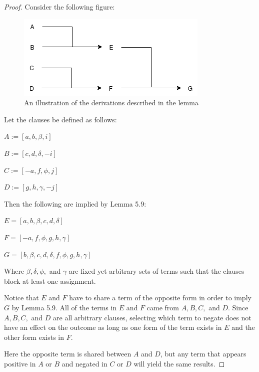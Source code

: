 \documentclass[manuscript]{acmart}
\begin{document}
    \begin{proof}
        Consider the following figure:

        \begin{figure}[h]
            \includegraphics[scale=0.8]{517a.png}
            \caption{An illustration of the derivations described in the lemma}
        \end{figure}

        Let the clauses be defined as follows:

        $A := [a, b, \beta, i]$

        $B := [c, d, \delta, -i]$
        
        $C := [-a, f, \phi, j]$
        
        $D := [g, h, \gamma, -j]$

        Then the following are implied by Lemma 5.9:

        $E = [a, b, \beta, c, d, \delta]$
        
        $F = [-a, f, \phi, g, h, \gamma]$
        
        $G = [b, \beta, c, d, \delta, f, \phi, g, h, \gamma]$
        
        Where $\beta, \delta, \phi,$ and $\gamma$ are fixed yet arbitrary sets of terms such that the clauses block at least one assignment.

        Notice that $E$ and $F$ have to share a term of the opposite form in order to imply $G$ by Lemma 5.9. All of the terms in $E$ and $F$ came from $A, B, C,$ and $D$. Since $A, B, C,$ and $D$ are all arbitrary clauses, selecting which term to negate does not have an effect on the outcome as long as one form of the term exists in $E$
        and the other form exists in $F$.
        
        Here the opposite term is shared between $A$ and $D$, but any term that appears positive in $A$ or $B$ and negated in $C$ or $D$ will yield the same results.
 

\end{proof}
\end{document}
